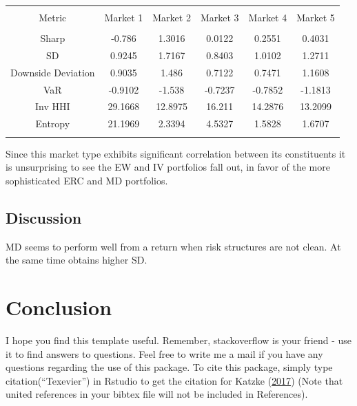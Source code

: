 \documentclass[11pt,preprint, authoryear]{elsarticle}
\let\origtable\table
\let\endorigtable\endtable
\renewenvironment{table}[1][2] {
    \expandafter\origtable\expandafter[H]
} {
    \endorigtable
}
\numberwithin{equation}{section}
\numberwithin{figure}{section}
\numberwithin{table}{section}
\begin{document}
\begin{table}[!htbp] \centering 
  \caption{Maximum Diversification} 
  \label{md} 
\begin{tabular}{@{\extracolsep{5pt}} cccccc} 
\\[-1.8ex]\hline 
\hline \\[-1.8ex] 
Metric & Market 1 & Market 2 & Market 3 & Market 4 & Market 5 \\ 
\hline \\[-1.8ex] 
Sharp & -0.786 & 1.3016 & 0.0122 & 0.2551 & 0.4031 \\ 
SD & 0.9245 & 1.7167 & 0.8403 & 1.0102 & 1.2711 \\ 
Downside Deviation & 0.9035 & 1.486 & 0.7122 & 0.7471 & 1.1608 \\ 
VaR & -0.9102 & -1.538 & -0.7237 & -0.7852 & -1.1813 \\ 
Inv HHI & 29.1668 & 12.8975 & 16.211 & 14.2876 & 13.2099 \\ 
Entropy & 21.1969 & 2.3394 & 4.5327 & 1.5828 & 1.6707 \\ 
\hline \\[-1.8ex] 
\end{tabular} 
\end{table}

Since this market type exhibits significant correlation between its
constituents it is unsurprising to see the EW and IV portfolios fall
out, in favor of the more sophisticated ERC and MD portfolios.

\hypertarget{discussion}{%
\subsection{Discussion}\label{discussion}}

MD seems to perform well from a return when risk structures are not
clean. At the same time obtains higher SD.

\hypertarget{conclusion}{%
\section{\texorpdfstring{Conclusion
\label{conclusion}}{Conclusion }}\label{conclusion}}

I hope you find this template useful. Remember, stackoverflow is your
friend - use it to find answers to questions. Feel free to write me a
mail if you have any questions regarding the use of this package. To
cite this package, simply type citation(``Texevier'') in Rstudio to get
the citation for Katzke (\protect\hyperlink{ref-Texevier}{2017}) (Note
that united references in your bibtex file will not be included in
References).
\end{document}
